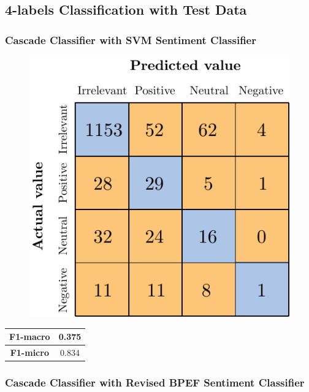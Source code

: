 \subsection{4-labels Classification with Test Data}


\subsubsection{Cascade Classifier with SVM Sentiment Classifier}

\begin{figure}[H]
	\centering
	\includegraphics[scale=1]{figures/conf_matrices/ita_cascade_svm/ita_cascade_svm_tst.pdf}
	\label{fig:ita_cascade_svm_tst}
\end{figure}

\begin{center}
	\begin{tabular}{ | c | c | } 
		\hline
		\textbf{F1-macro} & 0.375 \\
		\hline
		\textbf{F1-micro} & 0.834 \\ 
		\hline
	\end{tabular}
\end{center}



\subsubsection{Cascade Classifier with Revised BPEF Sentiment Classifier}

